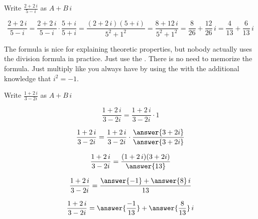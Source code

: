 \documentclass{ximera}
\begin{document}
\begin{example}




Write $\frac{2 + 2 \, i}{5 - i}$ as $A + B \, i$


\begin{explanation}

\[
\frac{2 + 2 \, i}{5 - i} = \frac{2 + 2 \, i}{5 - i} \cdot \frac{5 + i}{5 + i} = \frac{(2 + 2 \, i)(5 + i)}{5^2 + 1^2} = \frac{8 + 12 \, i}{5^2 + 1^2} = \frac{8}{26} + \frac{12}{26} \, i = \frac{4}{13} + \frac{6}{13} \, i
\]


\end{explanation}



\begin{observation}


The formula is nice for explaining theoretic properties, but nobody actually uses the division formula in practice.  Just use the .  There is no need to memorize the formula.  Just multiply like you always have by using the  with the additional knowledge that $i^2 = -1$.

\end{observation}

\end{example}










\begin{question}


Write $\frac{1 + 2 \, i}{3 - 2i}$ as $A + B \, i$



\[
\frac{1 + 2 \, i}{3 - 2i} = \frac{1 + 2 \, i}{3 - 2i} \cdot  1
\]


\[
\frac{1 + 2 \, i}{3 - 2i} = \frac{1 + 2 \, i}{3 - 2i} \cdot  \frac{\answer{3 + 2i}}{\answer{3 + 2i}}
\]


\[
\frac{1 + 2 \, i}{3 - 2i} = \frac{(1 + 2 \, i)(3 + 2i)}{\answer{13}} 
\]


\[
\frac{1 + 2 \, i}{3 - 2i} = \frac{\answer{-1} + \answer{8} \, i}{13} 
\]


\[
\frac{1 + 2 \, i}{3 - 2i} = \answer{\frac{-1}{13}} + \answer{\frac{8}{13}} \, i
\]

\end{question}
\end{document}
